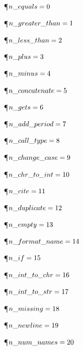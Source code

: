 \Y\P\D {}$\\{n\_equals}=0$\C{\.{=}}\par
\P\D {}$\\{n\_greater\_than}=1$\C{\.{>}}\par
\P\D {}$\\{n\_less\_than}=2$\C{\.{<}}\par
\P\D {}$\\{n\_plus}=3$\C{\.{+}}\par
\P\D {}$\\{n\_minus}=4$\C{\.{-}}\par
\P\D {}$\\{n\_concatenate}=5$\C{\.{*}}\par
\P\D {}$\\{n\_gets}=6$\C{\.{:=}}\par
\P\D {}$\\{n\_add\_period}=7$\par
\P\D {}$\\{n\_call\_type}=8$\par
\P\D {}$\\{n\_change\_case}=9$\par
\P\D {}$\\{n\_chr\_to\_int}=10$\par
\P\D {}$\\{n\_cite}=11$\par
\P\D {}$\\{n\_duplicate}=12$\par
\P\D {}$\\{n\_empty}=13$\par
\P\D {}$\\{n\_format\_name}=14$\par
\P\D {}$\\{n\_if}=15$\par
\P\D {}$\\{n\_int\_to\_chr}=16$\par
\P\D {}$\\{n\_int\_to\_str}=17$\par
\P\D {}$\\{n\_missing}=18$\par
\P\D {}$\\{n\_newline}=19$\par
\P\D {}$\\{n\_num\_names}=20$\par
